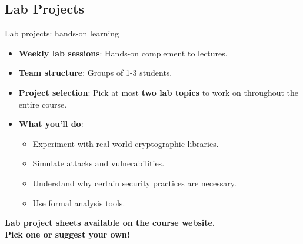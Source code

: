\documentclass[aspectratio=169, lualatex, handout]{beamer}
\begin{document}
\subsection{Lab Projects}

\begin{frame}{Lab projects: hands-on learning}
	\begin{itemize}[<+->]
		\item \textbf{Weekly lab sessions}: Hands-on complement to lectures.
		\item \textbf{Team structure}: Groups of 1-3 students.
		\item \textbf{Project selection}: Pick at most \textbf{two lab topics} to work on throughout the entire course.
		\item \textbf{What you'll do}:
		      \begin{itemize}
			      \item Experiment with real-world cryptographic libraries.
			      \item Simulate attacks and vulnerabilities.
			      \item Understand why certain security practices are necessary.
			      \item Use formal analysis tools.
		      \end{itemize}
	\end{itemize}
	\vspace{0.1cm}
	\begin{center}
		\Large\textcolor{cipherprimary}{\textbf{Lab project sheets available on the course website. \\ Pick one or suggest your own!}}
	\end{center}
\end{frame}
\end{document}
